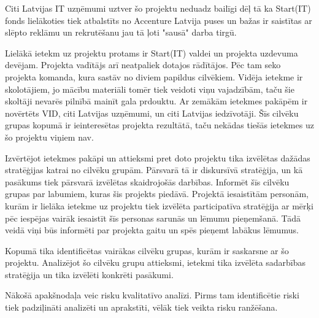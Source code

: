 Citi Latvijas IT uzņēmumi uztver šo projektu neduadz bailīgi dēļ tā ka Start(IT) fonds lielākoties tiek
atbalstīts no Accenture Latvija puses un bažas ir saistītas ar slēpto reklāmu un rekrutēšanu jau tā 
ļoti "sausā" darba tirgū.
\par
Lielākā ietekm uz projektu protams ir Start(IT) valdei un projekta uzdevuma devējam. Projekta vadītājs arī
neatpaliek dotajos rādītājos. Pēc tam seko projekta komanda, kura sastāv no diviem papildus cilvēkiem.
Vidēja ietekme ir skolotājiem, jo mācību materiāli tomēr tiek veidoti viņu vajadzībām, taču šie skoltāji
nevarēs pilnībā mainīt gala prdouktu. Ar zemākām ietekmes pakāpēm ir novērtēts VID, citi Latvijas uzņēmumi,
un citi Latvijas iedzīvotāji. Šīs cilvēku grupas kopumā ir ieinteresētas projekta rezultātā, taču nekādas
tiešās ietekmes uz šo projektu viņiem nav.
\par
Izvērtējot ietekmes pakāpi un attieksmi pret doto projektu tika izvēlētas dažādas stratēģijas katrai no cilvēku
grupām. Pārsvarā tā ir diskursīvā stratēģija, un kā pasākums tiek pārsvarā izvēlētas skaidrojošās darbības.
Informēt šīs cilvēku grupas par labumiem, kuras šis projekts piedāvā. Projektā iesaistītām personām, kurām
ir lielāka ietekme uz projektu tiek izvēlēta participatīva stratēģija ar mērķi pēc iespējas vairāk iesaistīt
šīs personas sarunās un lēmumu pieņemšanā. Tādā veidā viņi būs informēti par projekta gaitu un spēs pieņemt
labākus lēmumus. 
\par
Kopumā tika identificētas vairākas cilvēku grupas, kurām ir saskarsne ar šo projektu. Analizējot šo cilvēku
grupu attieksmi, ietekmi tika izvēlēta sadarbības stratēģija un tika izvēlēti konkrēti pasākumi.
\par
Nākošā apakšnodaļa veic risku kvalitatīvo analīzi. Pirms tam identificētie riski tiek padziļināti analizēti
un aprakstīti, vēlāk tiek veikta risku ranžēšana.
